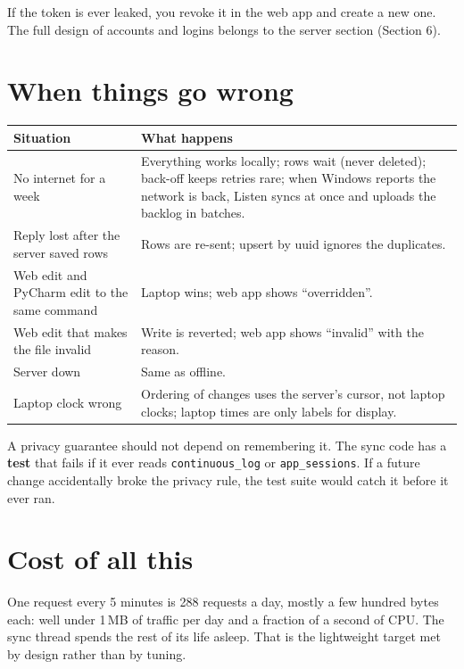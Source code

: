 \documentclass[11pt,a4paper]{article}
\begin{document}
\noindent If the token is ever leaked, you revoke it in the web app and create a new one. The
full design of accounts and logins belongs to the server section (Section 6).

\section{When things go wrong}
\begin{center}
\renewcommand{\arraystretch}{1.2}
\begin{tabularx}{\textwidth}{X X}
\toprule
\textbf{Situation} & \textbf{What happens} \\
\midrule
No internet for a week & Everything works locally; rows wait (never deleted); back-off keeps retries rare; when Windows reports the network is back, Listen syncs at once and uploads the backlog in batches. \\
Reply lost after the server saved rows & Rows are re-sent; upsert by uuid ignores the duplicates. \\
Web edit and PyCharm edit to the same command & Laptop wins; web app shows ``overridden''. \\
Web edit that makes the file invalid & Write is reverted; web app shows ``invalid'' with the reason. \\
Server down & Same as offline. \\
Laptop clock wrong & Ordering of changes uses the server's cursor, not laptop clocks; laptop times are only labels for display. \\
\bottomrule
\end{tabularx}
\end{center}

\begin{caution}
A privacy guarantee should not depend on remembering it. The sync code has a \textbf{test} that
fails if it ever reads \texttt{continuous\_log} or \texttt{app\_sessions}. If a future change
accidentally broke the privacy rule, the test suite would catch it before it ever ran.
\end{caution}

\section{Cost of all this}
One request every 5 minutes is 288 requests a day, mostly a few hundred bytes each: well under
1\,MB of traffic per day and a fraction of a second of CPU. The sync thread spends the rest of
its life asleep. That is the lightweight target met by design rather than by tuning.
\end{document}
